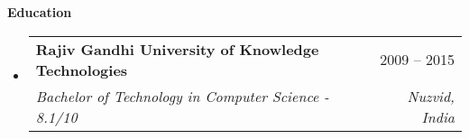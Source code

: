 \documentclass[letterpaper,12pt]{article}[leftmargin=*]
\makeatletter
\def \entryspacing {-0pt}
\renewcommand{\section}[2]{\vspace{5pt}
  \colorbox{secondary}{\color{white}\raggedbottom\normalsize\textbf{{#1}{\hspace{7pt}#2}}}
}
\newcommand{\resumeEntryStart}{\begin{itemize}[leftmargin=2.5mm]}
\newcommand{\resumeEntryEnd}{\end{itemize}\vspace{\entryspacing}}
\newcommand{\resumeEntryTSDL}[4]{
  \vspace{-1pt}\item[]
    \begin{tabularx}{0.97\textwidth}{X@{\hspace{60pt}}r}
      \textbf{\color{primary}#1} & {\firabook\color{accent}\small#2} \\
      \textit{\color{accent}\small#3} & \textit{\color{accent}\small#4} \\
    \end{tabularx}\vspace{-6pt}
}
\makeatother
\begin{document}
\section{\faGraduationCap}{Education}

\resumeEntryStart
\resumeEntryTSDL
{Rajiv Gandhi University of Knowledge Technologies}{2009 -- 2015}
{Bachelor of Technology in Computer Science - 8.1/10}{Nuzvid, India}
\resumeEntryEnd
\end{document}
